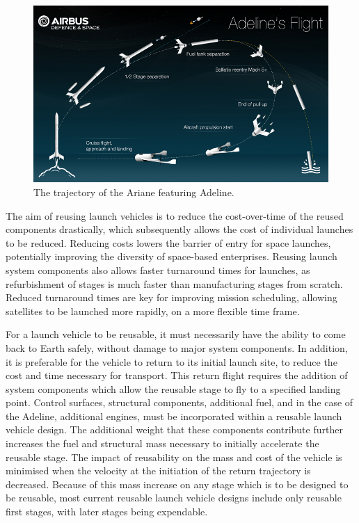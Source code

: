     
    
    
    
    
    \begin{figure}[ht]
    	\centering
    	\includegraphics[width=0.7\linewidth]{figures/2_literature-review/visuel_adeline1}
    	\caption{The trajectory of the Ariane featuring Adeline\cite{Adelineb}.}
    	\label{fig:visuel_adeline1}
    \end{figure}
    
    The aim of reusing launch vehicles is to reduce the cost-over-time of the reused components drastically, which subsequently allows the cost of individual launches to be reduced\cite{RichardWebb2016}. Reducing costs lowers the barrier of entry for space launches, potentially improving the diversity of space-based enterprises. 
    Reusing launch system components also allows faster turnaround times for launches, as refurbishment of stages is much faster than manufacturing stages from scratch. Reduced turnaround times are key for improving mission scheduling, allowing satellites to be launched more rapidly, on a more flexible time frame. 
    
    For a launch vehicle to be reusable, it must necessarily have the ability to come back to Earth safely, without damage to major system components. In addition, it is preferable for the vehicle to return to its initial launch site, to reduce the cost and time necessary for transport. This return flight requires the addition of system components which allow the reusable stage to fly to a specified landing point. Control surfaces\cite{Clark2018}, structural components\cite{Sarigul2003}, additional fuel\cite{Sarigul2003}, and in the case of the Adeline, additional engines\cite{Adeline}, must be incorporated within a reusable launch vehicle design. The additional weight that these components contribute further increases the fuel and structural mass necessary to initially accelerate the reusable stage. The impact of reusability on the mass and cost of the vehicle is minimised when the velocity at the initiation of the return trajectory is decreased. Because of this mass increase on any stage which is to be designed to be reusable, most current reusable launch vehicle designs include only reusable first stages, with later stages being expendable. 
    
